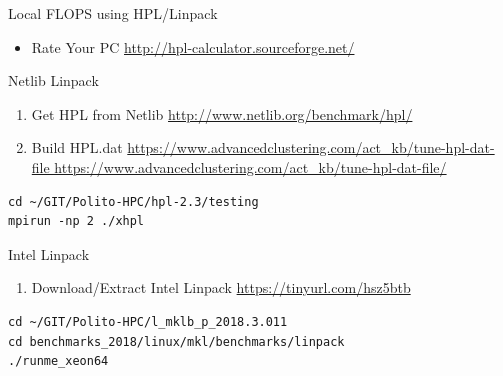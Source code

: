 \documentclass[ignorenonframetext,]{beamer}
\providecommand{\tightlist}{%
  \setlength{\itemsep}{0pt}\setlength{\parskip}{0pt}}
\begin{document}
\begin{frame}[fragile]{Local FLOPS using HPL/Linpack}

\begin{itemize}
\tightlist
\item
  Rate Your PC \url{http://hpl-calculator.sourceforge.net/}
\end{itemize}

\begin{block}{Netlib Linpack}


\begin{enumerate}
\tightlist
\item
  Get HPL from Netlib \url{http://www.netlib.org/benchmark/hpl/}
\item
  Build HPL.dat
  \href{https://www.advancedclustering.com/act_kb/tune-hpl-dat-file}{https://www.advancedclustering.com/act\_kb/tune-hpl-dat-file
  https://www.advancedclustering.com/act\_kb/tune-hpl-dat-file/}
\end{enumerate}

\begin{verbatim}
cd ~/GIT/Polito-HPC/hpl-2.3/testing
mpirun -np 2 ./xhpl
\end{verbatim}

\end{block}

\begin{block}{Intel Linpack}

\begin{enumerate}
\tightlist
\item
  Download/Extract Intel Linpack
  \href{https://software.intel.com/en-us/articles/intel-mkl-benchmarks-suite}{https://tinyurl.com/hsz5btb}
\end{enumerate}

\begin{verbatim}
cd ~/GIT/Polito-HPC/l_mklb_p_2018.3.011
cd benchmarks_2018/linux/mkl/benchmarks/linpack
./runme_xeon64
\end{verbatim}


\end{block}

\end{frame}
\end{document}
